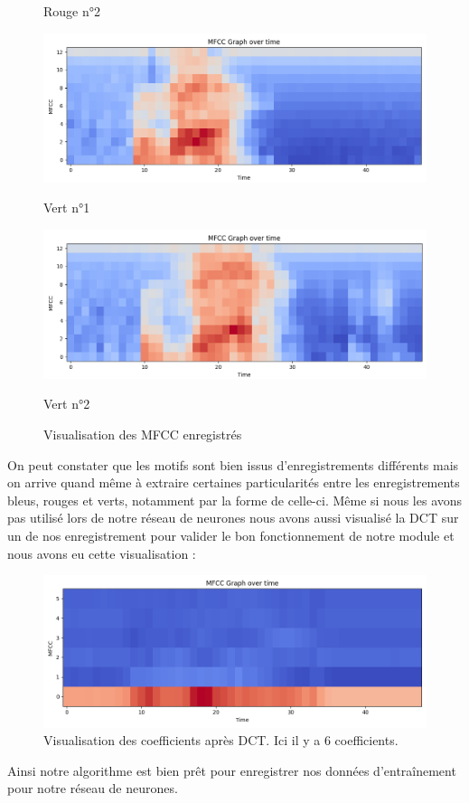 \documentclass[a4paper,11pt]{article}
\begin{document}
{\begin{figure}[H]
\begin{minipage}{0.48\textwidth}
\caption*{Rouge n°2}
\end{minipage}
\vspace{0.3cm}
\vfill
\begin{minipage}{0.48\textwidth}
\centering
\includegraphics[scale=0.3]{images/vert1.png}
\caption*{Vert n°1}
\end{minipage}
\hfill
\begin{minipage}{0.48\textwidth}
\centering
\includegraphics[scale=0.3]{images/vert2.png}
\caption*{Vert n°2}
\end{minipage}
\vspace{0.3cm}
\caption{Visualisation des MFCC enregistrés} \label{fig:visu_mfcc}
\end{figure}
}
On peut constater que les motifs sont bien issus d'enregistrements différents mais on arrive quand même à extraire certaines particularités entre les enregistrements bleus, rouges et verts, notamment par la forme de celle-ci. Même si nous les avons pas utilisé lors de notre réseau de neurones nous avons aussi visualisé la DCT sur un de nos enregistrement pour valider le bon fonctionnement de notre module et nous avons eu cette visualisation : 
\begin{figure}[H]
\centering
\includegraphics[scale=0.4]{images/dct.png}
\caption{Visualisation des coefficients après DCT. Ici il y a 6 coefficients.}
\end{figure}
Ainsi notre algorithme est bien prêt pour enregistrer nos données d'entraînement pour notre réseau de neurones.
\end{document}

